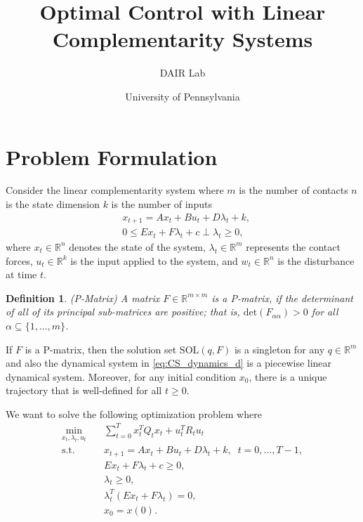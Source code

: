 \documentclass{article}
\title{Optimal Control with Linear Complementarity Systems}
\author{DAIR Lab}
\date{University of Pennsylvania}
\newtheorem{definition}{Definition}
\begin{document}
	\maketitle
	
\section{Problem Formulation}

Consider the linear complementarity system where
$m$ is the number of contacts
$n$ is the state dimension
$k$ is the number of inputs \\
\begin{align}
\label{eq:CS_dynamics_d}
& x_{t+1} = A x_t + B u_t + D \lambda_t + k, \\
\label{eq:CP_d}
& 0 \leq Ex_t + F \lambda_t + c \perp \lambda_t \geq 0,
\end{align}
where $x_t \in \mathbb{R}^n$ denotes the state of the system, $\lambda_t \in \mathbb{R}^m$ represents the contact forces, $u_t \in \mathbb{R}^k$ is the input applied to the system, and $w_t \in \mathbb{R}^n$ is the disturbance at time $t$.

\begin{definition}(P-Matrix)
	A matrix $F \in \mathbb{R}^{m \times m}$ is a P-matrix, if the determinant of all of its principal sub-matrices are positive; that is, $\text{det}(F_{\alpha \alpha}) > 0$ for all $\alpha \subseteq \{ 1, \ldots, m \} $.
\end{definition}
If $F$ is a P-matrix, then the solution set $\text{SOL}(q,F)$ is a singleton for any $q \in \mathbb{R}^m$ and also the dynamical system in \eqref{eq:CS_dynamics_d} is a piecewise linear dynamical system. Moreover, for any initial condition $x_0$, there is a unique trajectory that is well-defined for all $t \geq 0$.

We want to solve the following optimization problem where \\
\begin{equation}
\label{eq:opt_original_d}
\begin{aligned}
\min_{x_t, \lambda_t, u_t} \quad & \sum_{t=0}^T x_t^T Q_t x_t + u_t^T R_t u_t  \\
\textrm{s.t.} \quad &x_{t+1} = A x_t + B u_t + D \lambda_t + k, \; \; t = 0, \ldots, T-1,\\
& E x_t + F \lambda_t + c \geq 0, \\
& \lambda_t \geq 0, \\
& \lambda_t^T (E x_t + F \lambda_t) = 0, \\
& x_0 = x(0).
\end{aligned}
\end{equation}
\end{document}
